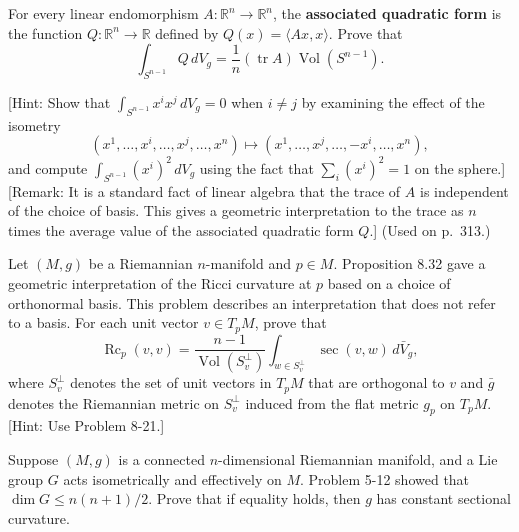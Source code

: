 \begin{exercise}
\label{prob:associated-quadratic-form}

For every linear endomorphism $A : \mathbb{R}^n \to \mathbb{R}^n$, the \textbf{associated quadratic form} is the function $Q : \mathbb{R}^n \to \mathbb{R}$ defined by $Q(x) = \langle Ax, x \rangle$. Prove that
\[
\int_{S^{n-1}} Q \, dV_g = \frac{1}{n}(\operatorname{tr} A)\operatorname{Vol}(S^{n-1}).
\]

[Hint: Show that $\int_{S^{n-1}} x^i x^j \, dV_g = 0$ when $i \ne j$ by examining the effect of the isometry
\[
(x^1, \ldots, x^i, \ldots, x^j, \ldots, x^n) \mapsto (x^1, \ldots, x^j, \ldots, -x^i, \ldots, x^n),
\]
and compute $\int_{S^{n-1}} (x^i)^2 \, dV_g$ using the fact that $\sum_i (x^i)^2 = 1$ on the sphere.] [Remark: It is a standard fact of linear algebra that the trace of $A$ is independent of the choice of basis. This gives a geometric interpretation to the trace as $n$ times the average value of the associated quadratic form $Q$.]
(Used on p.\ 313.)
\end{exercise}

\begin{exercise}
\label{prob:ricci-curvature-without-basis}

Let $(M, g)$ be a Riemannian $n$-manifold and $p \in M$. Proposition 8.32 gave a geometric interpretation of the Ricci curvature at $p$ based on a choice of orthonormal basis. This problem describes an interpretation that does not refer to a basis. For each unit vector $v \in T_p M$, prove that
\[
\operatorname{Rc}_p(v, v) = \frac{n-1}{\operatorname{Vol}(S_v^{\perp})} \int_{w \in S_v^{\perp}} \sec(v, w) \, d\bar{V}_g,
\]
where $S_v^{\perp}$ denotes the set of unit vectors in $T_p M$ that are orthogonal to $v$ and $\bar{g}$ denotes the Riemannian metric on $S_v^{\perp}$ induced from the flat metric $g_p$ on $T_p M$. [Hint: Use Problem 8-21.]
\end{exercise}

\begin{exercise}
\label{prob:lie-group-isometric-action-dimension}
Suppose $(M,g)$ is a connected $n$-dimensional Riemannian manifold, and a Lie group $G$ acts isometrically and effectively on $M$. Problem 5-12 showed that $\dim G \le n(n+1)/2$. Prove that if equality holds, then $g$ has constant sectional curvature.
\end{exercise}

